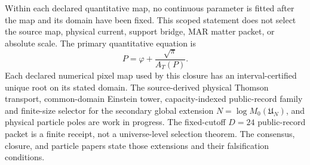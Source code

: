 \documentclass[11pt]{article}
\begin{document}
Within each declared quantitative map, no continuous parameter is fitted after
the map and its domain have been fixed. This scoped statement does not select
the source map, physical current, support bridge, MAR matter packet, or
absolute scale. The primary quantitative equation is
\[
P=\varphi+\frac{\sqrt\pi}{A_T(P)}.
\]
Each declared numerical pixel map used by this closure has an
interval-certified unique root on its stated domain. The source-derived
physical Thomson transport, common-domain
Einstein tower, capacity-indexed public-record family and finite-size selector
for the secondary global extension \(N=\log M_0(\mathfrak U_N)\), and physical particle poles are
work in progress. The fixed-cutoff \(D=24\) public-record packet is a finite
receipt, not a universe-level selection theorem. The consensus, closure, and particle papers state those
extensions and their falsification conditions.

\appendix

\end{document}
